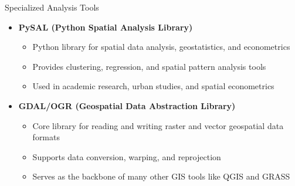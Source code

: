 \documentclass{beamer}
\begin{document}
        \begin{frame}{Specialized Analysis Tools}
            \begin{itemize}
                \item \textbf{PySAL (Python Spatial Analysis Library)}
                    \begin{itemize}
                        \item Python library for spatial data analysis, geostatistics, and econometrics
                        \item Provides clustering, regression, and spatial pattern analysis tools
                        \item Used in academic research, urban studies, and spatial econometrics
                    \end{itemize}
                \item \textbf{GDAL/OGR (Geospatial Data Abstraction Library)}
                    \begin{itemize}
                        \item Core library for reading and writing raster and vector geospatial data formats
                        \item Supports data conversion, warping, and reprojection
                        \item Serves as the backbone of many other GIS tools like QGIS and GRASS
                    \end{itemize}
            \end{itemize}
        \end{frame}

                
        \nocite{*}
        \frame[shrink=30]{\printbibliography[heading=bibintoc]}
    
\end{document}
